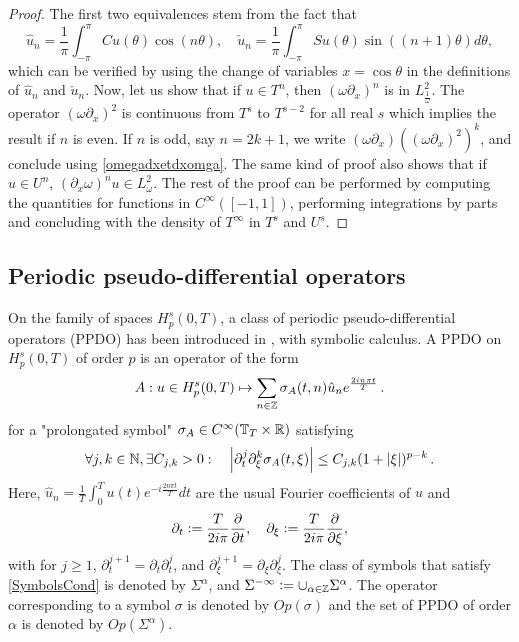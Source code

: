 \documentclass[a4paper]{article}
\begin{document}
\begin{proof}
	The first two equivalences stem from the fact that 
	\[\hat{u}_n = \frac{1}{\pi}\int_{-\pi}^{\pi} Cu(\theta) \cos(n \theta), \quad  \check{u}_n = \frac{1}{\pi} \int_{-\pi}^{\pi} Su(\theta) \sin((n+1)\theta)d\theta,\]
	which can be verified by using the change of variables $x = \cos\theta$ in the definitions of $\hat{u}_n$ and $\check{u}_n$. 
	Now, let us show that if $ u \in T^n$, then $(\omega \partial_x)^n$ is in $L^2_\frac{1}{\omega}$. The operator $(\omega \partial_x)^2$ is continuous from $T^s$ to $T^{s-2}$ for all real $s$ which implies the result if $n$ is even. If $n$ is odd, say $n = 2k + 1$, we write $(\omega \partial_x)((\omega \partial_x)^{2})^k$, and conclude using \autoref{omegadxetdxomga}.
	The same kind of proof also shows that if $u \in U^n$, $(\partial_x \omega )^nu \in L^2_\omega$.
	The rest of the proof can be performed by computing the quantities for functions in $C^{\infty}([-1,1])$, performing integrations by parts and concluding with the density of $T^{\infty}$ in $T^s$ and $U^s$. 
\end{proof}


\subsection{Periodic pseudo-differential operators}

On the family of spaces $H^s_p(0,T)$, a class of periodic pseudo-differential operators (PPDO) has been introduced in \cite{thrunen1998symbol}, with symbolic calculus. A PPDO on $H^s_p(0,T)$ of order $p$ is an operator of the form 
\[A : u \in H^s_p(0,T) \mapsto \sum_{n \in \mathbb{Z}} \sigma_A(t,n) \hat{u}_n e^{\frac{2in\pi t}{T} }\,.\]
for a "prolongated symbol" $\sigma_A \in C^{\infty}(\mathbb{T}_T \times \mathbb{R})$ satisfying 
\begin{equation}
\label{SymbolsCond}
	\forall j,k \in \mathbb{N}, \exists C_{j,k} >0 : \quad \left\lvert \partial_t^j \partial_\xi^k \sigma_A(t,\xi) \right\rvert \leq C_{j,k}(1 + \left\lvert \xi \right\rvert)^{p - k}\,.
\end{equation}
Here, $\hat{u}_n = \frac{1}{T}\int_{0}^{T}u(t) e^{-i\frac{2n\pi t}{T}}dt$ are the usual Fourier coefficients of $u$ and 
$${\partial_t \mathrel{\mathop:}= \frac{T}{2i\pi}\frac{\partial}{\partial t}}, \quad  \partial_\xi \mathrel{\mathop:}= \frac{T}{2i\pi}\frac{\partial}{\partial \xi},$$ 
with for $j \geq 1$, $\partial_t^{j+1} = \partial_t \partial_t^j$, and $\partial_\xi^{j+1} = \partial_\xi \partial_\xi^j$. 
The class of symbols that satisfy \eqref{SymbolsCond} is denoted by $\Sigma^\alpha$, and $\Sigma^{-\infty} \mathrel{\mathop:}= \cup_{\alpha \in \mathbb{Z}} \Sigma^\alpha$. The operator corresponding to a symbol $\sigma$ is denoted by $\textit{Op}(\sigma)$ and the set of PPDO of order $\alpha$ is denoted by $\textit{Op}(\Sigma^\alpha)$. 
\end{document}
